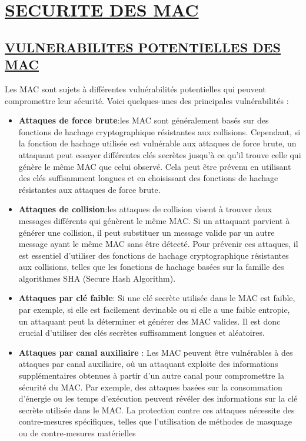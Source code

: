 \section{\textbf{\underline{SECURITE DES MAC}}}

\subsection{\textbf{\underline{VULNERABILITES POTENTIELLES DES MAC}}}

Les MAC sont sujets à différentes vulnérabilités potentielles qui peuvent compromettre leur sécurité. Voici quelques-unes des principales vulnérabilités :

\begin{itemize}[label=$\cdot$]
    \item \textbf{Attaques de force brute}:les MAC sont généralement basés sur des fonctions de hachage cryptographique résistantes aux collisions. Cependant, si la fonction de hachage utilisée est vulnérable aux attaques de force brute, un attaquant peut essayer différentes clés secrètes jusqu'à ce qu'il trouve celle qui génère le même MAC que celui observé. Cela peut être prévenu en utilisant des clés suffisamment longues et en choisissant des fonctions de hachage résistantes aux attaques de force brute.
    \item \textbf{Attaques de collision}:les attaques de collision visent à trouver deux messages différents qui génèrent le même MAC. Si un attaquant parvient à générer une collision, il peut substituer un message valide par un autre message ayant le même MAC sans être détecté. Pour prévenir ces attaques, il est essentiel d'utiliser des fonctions de hachage cryptographique résistantes aux collisions, telles que les fonctions de hachage basées sur la famille des algorithmes SHA (Secure Hash Algorithm).
    \item \textbf{Attaques par clé faible}: Si une clé secrète utilisée dans le MAC est faible, par exemple, si elle est facilement devinable ou si elle a une faible entropie, un attaquant peut la déterminer et générer des MAC valides. Il est donc crucial d'utiliser des clés secrètes suffisamment longues et aléatoires.
    \item \textbf{Attaques par canal auxiliaire} : Les MAC peuvent être vulnérables à des attaques par canal auxiliaire, où un attaquant exploite des informations supplémentaires obtenues à partir d'un autre canal pour compromettre la sécurité du MAC. Par exemple, des attaques basées sur la consommation d'énergie ou les temps d'exécution peuvent révéler des informations sur la clé secrète utilisée dans le MAC. La protection contre ces attaques nécessite des contre-mesures spécifiques, telles que l'utilisation de méthodes de masquage ou de contre-mesures matérielles
\end{itemize}

